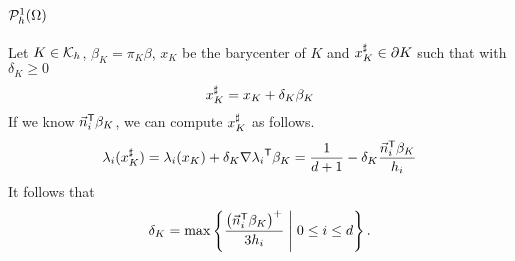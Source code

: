 %
\subsection{$\Pspace^1_h(\Omega)$}\label{subsec:}
%
%
Let $K\in\Cells_h$, $\beta_K=\pi_K\beta$, $x_K$ be the barycenter of $K$ and $\xup\in\partial K$ such that  with 
$\delta_K\ge0$
%
\begin{equation}\label{eq:}
\xup = x_K + \delta_K \beta_K
\end{equation}
%
If we know $\transpose{\normal[i]}\beta_K$, we can compute $\xup$ as follows.
%
\begin{align*}
\lambda_i(\xup) = \lambda_i(x_K) + \delta_K \transpose{\nabla\lambda_i}\beta_K
= \frac{1}{d+1} - \delta_K \frac{\transpose{\normal[i]}\beta_K}{h_i}
\end{align*}
%
It follows that
%
\begin{equation}\label{eq:}
\delta_K = \max\SetDef{\frac{\left(\transpose{\normal[i]}\beta_K\right)^+}{3h_i}}{0\le i\le d}.
\end{equation}
%


\printbibliography[title=References Section~\thesection]


